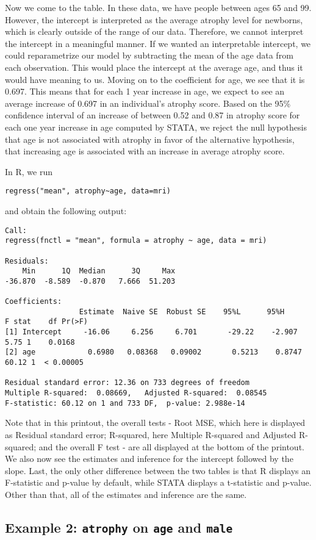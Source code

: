 \documentclass[11pt,letterpaper,fleqn]{report}
\begin{document}
Now we come to the table. In these data, we have people between ages 65 and 99. However, the intercept is interpreted as the average atrophy level for newborns, which is clearly outside of the range of our data. Therefore, we cannot interpret the intercept in a meaningful manner. If we wanted an interpretable intercept, we could reparametrize our model by subtracting the mean of the age data from each observation. This would place the intercept at the average age, and thus it would have meaning to us. Moving on to the coefficient for age, we see that it is 0.697. This means that for each 1 year increase in age, we expect to see an average increase of 0.697 in an individual's atrophy score. Based on the 95\% confidence interval of an increase of between 0.52 and 0.87 in atrophy score for each one year increase in age computed by STATA, we reject the null hypothesis that age is not associated with atrophy in favor of the alternative hypothesis, that increasing age is associated with an increase in average atrophy score. 


In R, we run
\begin{verbatim}
regress("mean", atrophy~age, data=mri)
\end{verbatim}
and obtain the following output:
{\fontsize{10pt}{10}\selectfont
\begin{verbatim}
Call:
regress(fnctl = "mean", formula = atrophy ~ age, data = mri)

Residuals:
    Min      1Q  Median      3Q     Max 
-36.870  -8.589  -0.870   7.666  51.203 

Coefficients:
                 Estimate  Naive SE  Robust SE    95%L      95%H         F stat    df Pr(>F)   
[1] Intercept     -16.06     6.256     6.701       -29.22    -2.907           5.75 1    0.0168 
[2] age            0.6980   0.08368   0.09002       0.5213    0.8747         60.12 1  < 0.00005

Residual standard error: 12.36 on 733 degrees of freedom
Multiple R-squared:  0.08669,	Adjusted R-squared:  0.08545 
F-statistic: 60.12 on 1 and 733 DF,  p-value: 2.988e-14
\end{verbatim}}

Note that in this printout, the overall tests - Root MSE, which here is displayed as Residual standard error; R-squared, here Multiple R-squared and Adjusted R-squared; and the overall F test - are all displayed at the bottom of the printout. We also now see the estimates and inference for the intercept followed by the slope. Last, the only other difference between the two tables is that R displays an F-statistic and p-value by default, while STATA displays a t-statistic and p-value. Other than that, all of the estimates and inference are the same.

\subsection{Example 2: \texttt{atrophy} on \texttt{age} and \texttt{male}}
\end{document}
